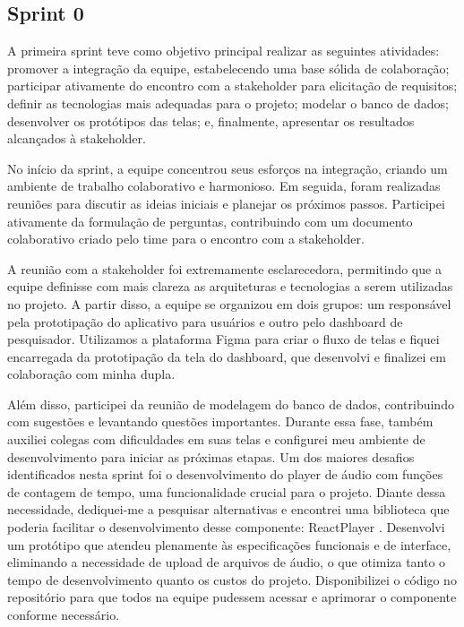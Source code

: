 \subsection{Sprint 0}

A primeira sprint teve como objetivo principal realizar as seguintes atividades: promover a integração da equipe, estabelecendo uma base sólida de colaboração; participar ativamente do encontro com a stakeholder para elicitação de requisitos; definir as tecnologias mais adequadas para o projeto; modelar o banco de dados; desenvolver os protótipos das telas; e, finalmente, apresentar os resultados alcançados à stakeholder.

No início da sprint, a equipe concentrou seus esforços na integração, criando um ambiente de trabalho colaborativo e harmonioso. Em seguida, foram realizadas reuniões para discutir as ideias iniciais e planejar os próximos passos. Participei ativamente da formulação de perguntas, contribuindo com um documento colaborativo criado pelo time para o encontro com a stakeholder.

A reunião com a stakeholder foi extremamente esclarecedora, permitindo que a equipe definisse com mais clareza as arquiteturas e tecnologias a serem utilizadas no projeto. A partir disso, a equipe se organizou em dois grupos: um responsável pela prototipação do aplicativo para usuários e outro pelo dashboard de pesquisador. Utilizamos a plataforma Figma para criar o fluxo de telas e fiquei encarregada da prototipação da tela do dashboard, que desenvolvi e finalizei em colaboração com minha dupla.

Além disso, participei da reunião de modelagem do banco de dados, contribuindo com sugestões e levantando questões importantes. Durante essa fase, também auxiliei colegas com dificuldades em suas telas e configurei meu ambiente de desenvolvimento para iniciar as próximas etapas. Um dos maiores desafios identificados nesta sprint foi o desenvolvimento do player de áudio com funções de contagem de tempo, uma funcionalidade crucial para o projeto. Diante dessa necessidade, dediquei-me a pesquisar alternativas e encontrei uma biblioteca que poderia facilitar o desenvolvimento desse componente: ReactPlayer \cite{ReactPlayer}. Desenvolvi um protótipo que atendeu plenamente às especificações funcionais e de interface, eliminando a necessidade de upload de arquivos de áudio, o que otimiza tanto o tempo de desenvolvimento quanto os custos do projeto. Disponibilizei o código no repositório para que todos na equipe pudessem acessar e aprimorar o componente conforme necessário.


